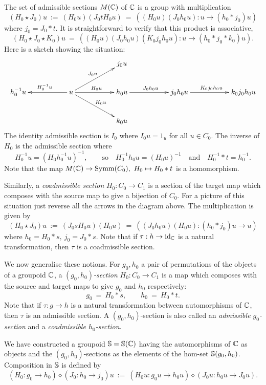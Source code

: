 \medskip
The set of admissible sections $M(\mathbb{C})$ of $\mathbb{C}$ is a group 
with multiplication 
$$
(H_0 \star J_0)u ~:=~ (H_0 u)(J_0 t H_0u) 
                  ~=~ ((H_0 u)(J_0 h_0 u) : u \to (h_0 * j_0)u)  
$$
where $j_0=J_0*t$. 
It is straightforward to verify that this product is associative, 
$$
(H_0 \star J_0 \star K_0)u 
  ~=~  ((H_0 u)(J_0 h_0 u)(K_0 j_0 h_0 u) : u \to (h_0 * j_0 * k_0)u). 
$$
Here is a sketch showing the situation: 
$$
\xymatrix{
  &&  &&  j_0 u 
          &&  &&  \\
h_0^{-1}u 
  &&  u  \ar[ll]_{H_0^{-1} u}  \ar[rr]^{H_0 u} 
         \ar[urr]^{J_0 u} \ar[drr]^{K_0 u} 
      &&  h_0u  \ar[rr]^{J_0 h_0 u} 
          &&  j_0 h_0 u  \ar[rr]^{K_0 j_0 h_0 u}
              &&  k_0 j_0 h_0 u  \\
  &&  &&  k_0 u 
          &&  &&  
}$$
The identity admissible section is $I_0$ 
where $I_0u = 1_u$ for all $u \in C_0$. 
The inverse of $H_0$ is the admissible section where 
$$
H_0^{-1} u = (H_0 h_0^{-1} u)^{-1}, 
\qquad\text{so}\quad 
H_0^{-1} h_0 u = (H_0 u)^{-1} 
\quad\text{and}\quad 
H_0^{-1}*t = h_0^{-1}. 
$$
Note that the map $M(\mathbb{C}) \to \mathrm{Symm}(C_0),~ H_0 \mapsto H_0*t$ 
is a homomorphism.

\bigskip
Similarly, a \emph{coadmissible section} $H_0 : C_0 \to C_1$ 
is a section of the target map which composes with the source map 
to give a bijection of $C_0$. 
For a picture of this situation just reverse all the arrows 
in the diagram above. 
The multiplication is given by 
$$
(H_0 \star J_0)u ~:=~ (J_0 s H_0 u)(H_0 u)
                  ~=~ ((J_0 h_0 u)(H_0 u) : (h_0 * j_0)u \to u)  
$$
where $h_0=H_0*s,~ j_0=J_0*s$. 
Note that if $\tau : h \to \mathrm{id}_{\mathbb{C}}$ is a natural transformation, 
then $\tau$ is a coadmissible section. 


\bigskip
We now generalise these notions. 
For $g_0,h_0$ a pair of permutations of the objects of a groupoid $\mathbb{C}$, 
a \emph{$(g_0,h_0)$-section} $H_0 : C_0 \to C_1$ 
is a map which composes with the source and target maps to give 
$g_0$ and $h_0$ respectively: 
$$
g_0 ~=~ H_0 * s, \qquad 
h_0 ~=~ H_0 * t.
$$
Note that if $\tau : g \to h$ is a natural transformation 
between automorphisms of $\mathbb{C}$, then $\tau$ is an admissible section. 
A $(g_0,h_0)$-section is also called an \emph{admissible $g_0$-section} 
and a \emph{coadmissible $h_0$-section}. 

We have constructed a groupoid $\mathbb{S}=\mathbb{S}(\mathbb{C})$ 
having the automorphisms of $\mathbb{C}$ as objects 
and the $(g_0,h_0)$-sections as the elements of the hom-set $\mathbb{S}(g_0,h_0)$. 
Composition in $\mathbb{S}$ is defined by 
$$
(H_0 : g_0 \to h_0) \diamond (J_0 : h_0 \to j_0)u 
~:=~ (H_0 u : g_0 u \to h_0 u) \diamond (J_0 u : h_0 u \to J_0 u). 
$$

